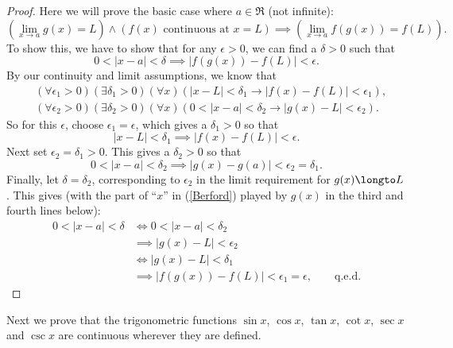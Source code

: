 \begin{proof}
Here we will prove the basic case where $a\in\Re$ (not infinite):
$$\left(\lim_{x\to a}g(x)=L\right)\wedge
  \left(f(x)\text{ continuous at }x=L\right)
  \implies\left(\lim_{x\to a}f(g(x))=f(L)\right).$$
To show this, we have to show that for any 
$\epsilon>0$, we can find  a $\delta>0$
such that
$$0<|x-a|<\delta\implies|f(g(x))-f(L)|<\epsilon.$$
By our continuity and limit assumptions, we know that
\begin{align}
&(\forall\epsilon_1>0)(\exists\delta_1>0)(\forall x)(|x-L|<\delta_1
  \longrightarrow|f(x)-f(L)|<\epsilon_1),\label{Berford}\\
&(\forall\epsilon_2>0)(\exists\delta_2>0)(\forall x)(0<|x-a|<\delta_2
  \longrightarrow|g(x)-L|<\epsilon_2).\label{Berford2}\end{align}
So for this $\epsilon$, choose $\epsilon_1=\epsilon$,
which gives a $\delta_1>0$ so that
$$|x-L|<\delta_1\implies|f(x)-f(L)|<\epsilon.$$
Next set $\epsilon_2=\delta_1>0$. This gives a $\delta_2>0$
so that 
$$0<|x-a|<\delta_2\implies|g(x)-g(a)|<\epsilon_2=\delta_1.$$
Finally, let $\delta=\delta_2$, corresponding to $\epsilon_2$
in the limit requirement for $g(x)\longto L$. This gives
(with the part of ``$x$'' in (\ref{Berford}) played by
$g(x)$ in the third and fourth lines below):
\begin{align*}
0<|x-a|<\delta&\iff0<|x-a|<\delta_2\\
&\implies|g(x)-L|<\epsilon_2\\
&\iff |g(x)-L|<\delta_1\\
&\implies |f(g(x))-f(L)|<\epsilon_1=\epsilon,\qquad\text{q.e.d.}
\end{align*}\end{proof}

Next we prove that the trigonometric functions
$\sin x$, $\cos x$, $\tan x$, $\cot x$, $\sec x$ and $\csc x$
are continuous  wherever they are defined.

